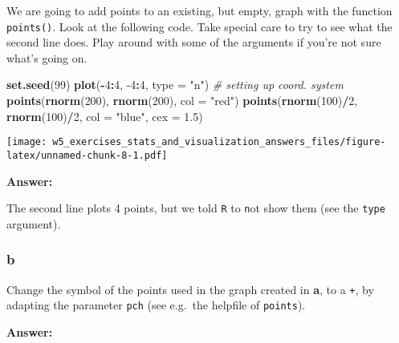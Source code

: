 \documentclass[]{article}
\newenvironment{Shaded}{\begin{snugshade}}{\end{snugshade}}
\newcommand{\CommentTok}[1]{\textcolor[rgb]{0.56,0.35,0.01}{\textit{#1}}}
\newcommand{\DataTypeTok}[1]{\textcolor[rgb]{0.13,0.29,0.53}{#1}}
\newcommand{\DecValTok}[1]{\textcolor[rgb]{0.00,0.00,0.81}{#1}}
\newcommand{\FloatTok}[1]{\textcolor[rgb]{0.00,0.00,0.81}{#1}}
\newcommand{\KeywordTok}[1]{\textcolor[rgb]{0.13,0.29,0.53}{\textbf{#1}}}
\newcommand{\NormalTok}[1]{#1}
\newcommand{\OperatorTok}[1]{\textcolor[rgb]{0.81,0.36,0.00}{\textbf{#1}}}
\newcommand{\StringTok}[1]{\textcolor[rgb]{0.31,0.60,0.02}{#1}}
\begin{document}
We are going to add points to an existing, but empty, graph with the
function \texttt{points()}. Look at the following code. Take special
care to try to see what the second line does. Play around with some of
the arguments if you're not sure what's going on.

\begin{Shaded}
\begin{Highlighting}[]
\KeywordTok{set.seed}\NormalTok{(}\DecValTok{99}\NormalTok{)}
\KeywordTok{plot}\NormalTok{(}\OperatorTok{-}\DecValTok{4}\OperatorTok{:}\DecValTok{4}\NormalTok{, }\DecValTok{-4}\OperatorTok{:}\DecValTok{4}\NormalTok{, }\DataTypeTok{type =} \StringTok{"n"}\NormalTok{)  }\CommentTok{# setting up coord. system}
\KeywordTok{points}\NormalTok{(}\KeywordTok{rnorm}\NormalTok{(}\DecValTok{200}\NormalTok{), }\KeywordTok{rnorm}\NormalTok{(}\DecValTok{200}\NormalTok{), }\DataTypeTok{col =} \StringTok{"red"}\NormalTok{)}
\KeywordTok{points}\NormalTok{(}\KeywordTok{rnorm}\NormalTok{(}\DecValTok{100}\NormalTok{)}\OperatorTok{/}\DecValTok{2}\NormalTok{, }\KeywordTok{rnorm}\NormalTok{(}\DecValTok{100}\NormalTok{)}\OperatorTok{/}\DecValTok{2}\NormalTok{, }\DataTypeTok{col =} \StringTok{"blue"}\NormalTok{, }\DataTypeTok{cex =} \FloatTok{1.5}\NormalTok{)}
\end{Highlighting}
\end{Shaded}

\texttt{[image: w5\_exercises\_stats\_and\_visualization\_answers\_files/figure-latex/unnamed-chunk-8-1.pdf]}

\textbf{Answer:}

The second line plots 4 points, but we told \texttt{R} to \texttt{n}ot
show them (see the \texttt{type} argument).

\hypertarget{b-2}{%
\subsubsection{b}\label{b-2}}

Change the symbol of the points used in the graph created in \textbf{a},
to a \texttt{+}, by adapting the parameter \texttt{pch} (see e.g.~the
helpfile of \texttt{points}).

\textbf{Answer:}
\end{document}
